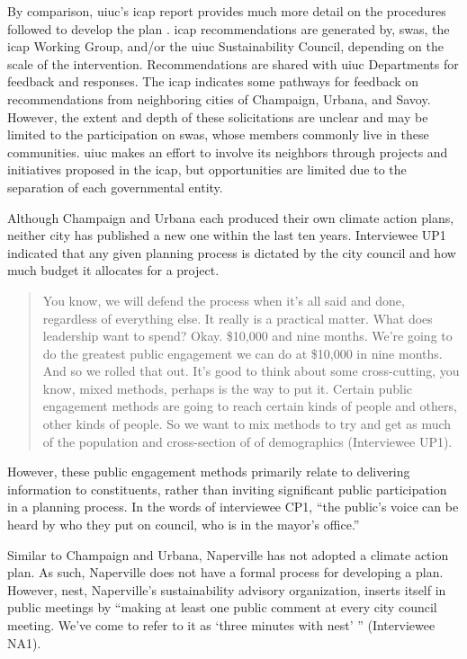 By comparison, \ac{uiuc}'s \acf{icap} report provides much more detail on the
procedures followed to develop the plan
\cite{institute_for_sustainability_energy_and_environment_illinois_2020}.
\ac{icap} recommendations are generated by, \acp{swa}, the \ac{icap} Working
Group, and/or the \ac{uiuc} Sustainability Council, depending on the scale of
the intervention. Recommendations are shared with \ac{uiuc} Departments for
feedback and responses. The \ac{icap} indicates some pathways for feedback on
recommendations from neighboring cities of Champaign, Urbana, and Savoy.
However, the extent and depth of these solicitations are unclear and may be
limited to the participation on \acp{swa}, whose members commonly live in these
communities. \ac{uiuc} makes an effort to involve its neighbors through projects
and initiatives proposed in the \ac{icap}, but opportunities are limited due to
the separation of each governmental entity. 

Although Champaign and Urbana each produced their own climate action plans,
neither city has published a new one within the last ten years. Interviewee UP1
indicated that any given planning process is dictated by the city council and
how much budget it allocates for a project.
\begin{quote}
    You know, we will defend the process when it's all said and done, regardless
    of everything else. It really is a practical matter. What does leadership
    want to spend? Okay. \$10,000 and nine months. We're going to do the
    greatest public engagement we can do at \$10,000 in nine months. And so we
    rolled that out. It's good to think about some cross-cutting, you know,
    mixed methods, perhaps is the way to put it. Certain public engagement
    methods are going to reach certain kinds of people and others, other kinds
    of people. So we want to mix methods to try and get as much of the
    population and cross-section of of demographics (Interviewee UP1).
\end{quote}
However, these public engagement methods primarily relate to delivering
information to constituents, rather than inviting significant public
participation in a planning process. In the words of interviewee CP1, ``the
public's voice can be heard by who they put on council, who is in the mayor's
office.''

Similar to Champaign and Urbana, Naperville has not adopted a climate action plan.
As such, Naperville does not have a formal process for developing a plan. However,
\ac{nest}, Naperville's sustainability advisory organization, inserts itself in public
meetings by ``making at least one public comment at every city council meeting. We've
come to refer to it as `three minutes with \ac{nest}' '' (Interviewee NA1).

